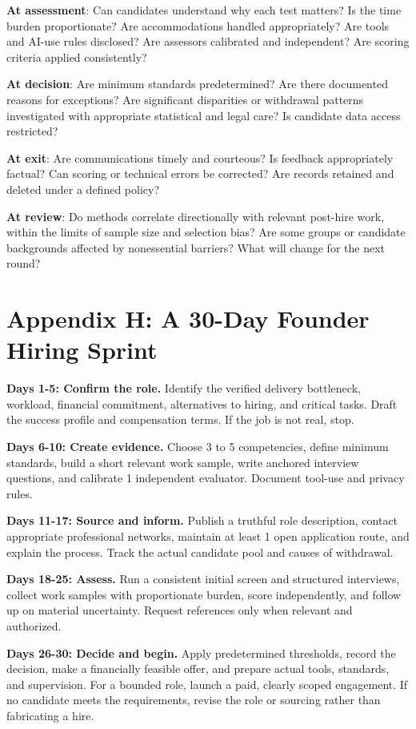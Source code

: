 \textbf{At assessment}: Can candidates understand why each test matters? Is the time burden proportionate? Are accommodations handled appropriately? Are tools and AI-use rules disclosed? Are assessors calibrated and independent? Are scoring criteria applied consistently?

\textbf{At decision}: Are minimum standards predetermined? Are there documented reasons for exceptions? Are significant disparities or withdrawal patterns investigated with appropriate statistical and legal care? Is candidate data access restricted?

\textbf{At exit}: Are communications timely and courteous? Is feedback appropriately factual? Can scoring or technical errors be corrected? Are records retained and deleted under a defined policy?

\textbf{At review}: Do methods correlate directionally with relevant post-hire work, within the limits of sample size and selection bias? Are some groups or candidate backgrounds affected by nonessential barriers? What will change for the next round?

\section*{Appendix H: A 30-Day Founder Hiring Sprint}

\textbf{Days 1-5: Confirm the role.} Identify the verified delivery bottleneck, workload, financial commitment, alternatives to hiring, and critical tasks. Draft the success profile and compensation terms. If the job is not real, stop.

\textbf{Days 6-10: Create evidence.} Choose 3 to 5 competencies, define minimum standards, build a short relevant work sample, write anchored interview questions, and calibrate 1 independent evaluator. Document tool-use and privacy rules.

\textbf{Days 11-17: Source and inform.} Publish a truthful role description, contact appropriate professional networks, maintain at least 1 open application route, and explain the process. Track the actual candidate pool and causes of withdrawal.

\textbf{Days 18-25: Assess.} Run a consistent initial screen and structured interviews, collect work samples with proportionate burden, score independently, and follow up on material uncertainty. Request references only when relevant and authorized.

\textbf{Days 26-30: Decide and begin.} Apply predetermined thresholds, record the decision, make a financially feasible offer, and prepare actual tools, standards, and supervision. For a bounded role, launch a paid, clearly scoped engagement. If no candidate meets the requirements, revise the role or sourcing rather than fabricating a hire.

